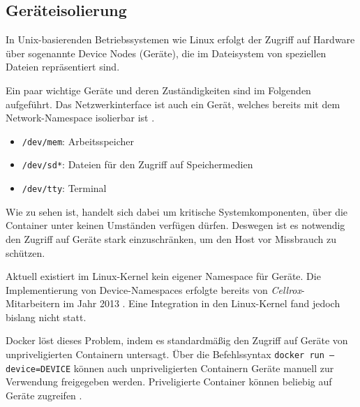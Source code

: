 \documentclass[../main.tex]{subfiles}
\begin{document}
		\subsection{Geräteisolierung}

			In Unix-basierenden Betriebssystemen wie Linux erfolgt der Zugriff auf Hardware über sogenannte Device Nodes (Geräte), die im Dateisystem von speziellen Dateien repräsentiert sind.

			Ein paar wichtige Geräte und deren Zuständigkeiten sind im Folgenden aufgeführt. Das Netzwerkinterface ist auch ein Gerät, welches bereits mit dem Network-Namespace isolierbar ist \cite{deviceNs}.

			\begin{itemize}
				\item \texttt{/dev/mem}: Arbeitsspeicher
				\item \texttt{/dev/sd*}: Dateien für den Zugriff auf Speichermedien
				\item \texttt{/dev/tty}: Terminal
			\end{itemize}

			Wie zu sehen ist, handelt sich dabei um kritische Systemkomponenten, über die Container unter keinen Umständen verfügen dürfen. Deswegen ist es notwendig den Zugriff auf Geräte stark einzuschränken, um den Host vor Missbrauch zu schützen.

			Aktuell existiert im Linux-Kernel kein eigener Namespace für Geräte. Die Implementierung von Device-Namespaces erfolgte bereits von \emph{Cellrox}-Mitarbeitern im Jahr 2013 \cite{deviceNsCerrox}. Eine Integration in den Linux-Kernel fand jedoch bislang nicht statt.

			Docker löst dieses Problem, indem es standardmäßig den Zugriff auf Geräte von unpriveligierten Containern untersagt. Über die Befehlssyntax \texttt{docker run --device=DEVICE} können auch unpriveligierten Containern Geräte manuell zur Verwendung freigegeben werden. Priveligierte Container können beliebig auf Geräte zugreifen \cite{dockerRun}.
\end{document}
